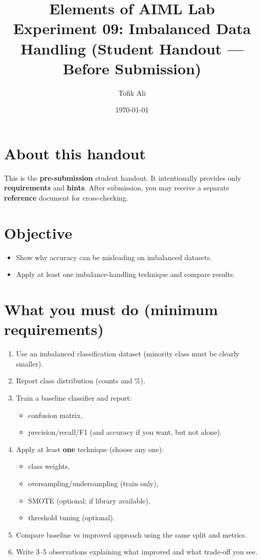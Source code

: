 \documentclass[11pt]{article}
\title{Elements of AIML Lab\\Experiment 09: Imbalanced Data Handling (Student Handout — Before Submission)}
\author{Tofik Ali}
\date{\today}
\begin{document}
\maketitle
\tableofcontents

\section{About this handout}
This is the \textbf{pre-submission} student handout.
It intentionally provides only \textbf{requirements} and \textbf{hints}.
After submission, you may receive a separate \textbf{reference} document for cross-checking.

\section{Objective}
\begin{itemize}[leftmargin=*]
  \item Show why accuracy can be misleading on imbalanced datasets.
  \item Apply at least one imbalance-handling technique and compare results.
\end{itemize}

\section{What you must do (minimum requirements)}
\begin{enumerate}[leftmargin=*]
  \item Use an imbalanced classification dataset (minority class must be clearly smaller).
  \item Report class distribution (counts and \%).
  \item Train a baseline classifier and report:
  \begin{itemize}[leftmargin=*]
    \item confusion matrix,
    \item precision/recall/F1 (and accuracy if you want, but not alone).
  \end{itemize}
  \item Apply at least \textbf{one} technique (choose any one):
  \begin{itemize}[leftmargin=*]
    \item class weights,
    \item oversampling/undersampling (train only),
    \item SMOTE (optional; if library available),
    \item threshold tuning (optional).
  \end{itemize}
  \item Compare baseline vs improved approach using the same split and metrics.
  \item Write 3--5 observations explaining what improved and what trade-off you see.
\end{enumerate}
\end{document}
